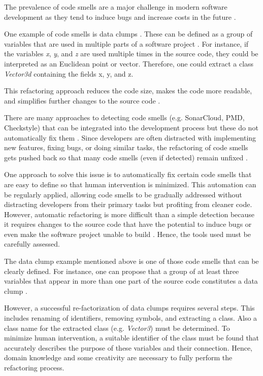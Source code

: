 \label{sec:introduction}
The prevalence of code smells are a major challenge  in modern software development as they tend to induce bugs and increase costs in the future \cite{mealyEvaluatingSoftwareRefactoring2006}.

One example of code smells is data clumps \cite{BaumgartnerAP23}. These can be defined as a group of variables that are used in multiple parts of a software project \cite{fowler2019refactoring}. For instance, if the variables \textit{x}, \textit{y}, and \textit{z} are used multiple times in the source code, they could be interpreted as an Euclidean point or vector. Therefore, one could extract  a class \textit{Vector3d} containing the fields x, y, and z. 

This refactoring approach reduces the code size, makes the code more readable, and simplifies further changes to the source code \cite{data_clumps_refactoring_guru} \cite{join_data_items}. 

There are many approaches to detecting code smells (e.g. SonarCloud,  PMD, Checkstyle) that can be integrated into the development process but these do not automatically fix them  \cite{vidalApproachPrioritizeCode2016}. 
Since developers are often distracted with implementing new features, fixing bugs, or doing similar tasks, the refactoring of code smells gets pushed back so that many code smells (even if detected) remain unfixed   \cite{10.1145/2393596.2393655}.


One approach to solve this issue is to automatically fix certain code smells that are easy to define so that human intervention is minimized. This automation can be regularly applied, allowing code smells to be gradually addressed without distracting developers from their primary tasks but profiting from cleaner code. 
However,  automatic refactoring  is more difficult than a simple detection because it requires changes to the source code that have the potential to induce bugs or even make the software project unable to build \cite{9796303}. Hence, the tools used must be carefully assessed. 

The data clump example mentioned above is one of those code smells that can be clearly defined. For instance, one can propose that a group of at least three variables that appear in more than one part of the source code constitutes a data clump \cite{zhangImprovingPrecisionFowler2008}.




However, a successful re-factorization of data clumps requires several steps. This includes renaming of identifiers, removing symbols, and extracting a class. Also a class name for the extracted class (e.g. \textit{Vector3}) must be determined. To minimize human intervention, a suitable identifier of the class must be found that accurately describes the purpose of these variables and their connection. Hence, domain knowledge and some creativity are necessary to fully perform the refactoring process.

